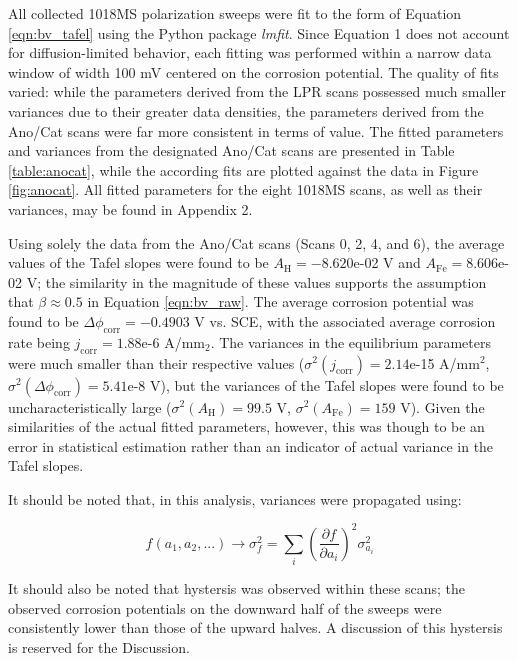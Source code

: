 All collected 1018MS polarization sweeps were fit to the form of Equation \ref{eqn:bv_tafel} using the Python package \textit{lmfit}.\cite{lmfit}  Since Equation 1 does not account for diffusion-limited behavior, each fitting was performed within a narrow data window of width 100 mV centered on the corrosion potential.  The quality of fits varied: while the parameters derived from the LPR scans possessed much smaller variances due to their greater data densities, the parameters derived from the Ano/Cat scans were far more consistent in terms of value.  The fitted parameters and variances from the designated Ano/Cat scans are presented in Table \ref{table:anocat}, while the according fits are plotted against the data in Figure \ref{fig:anocat}.  All fitted parameters for the eight 1018MS scans, as well as their variances, may be found in Appendix 2.

Using solely the data from the Ano/Cat scans (Scans 0, 2, 4, and 6), the average values of the Tafel slopes were found to be $A_{\text{H}} = -8.620$e-02 V and $A_{\text{Fe}} = 8.606$e-02 V; the similarity in the magnitude of these values supports the assumption that $\beta \approx 0.5$ in Equation \ref{eqn:bv_raw}.  The average corrosion potential was found to be $\Delta \phi_{\text{corr}} = -0.4903$ V vs. SCE, with the associated average corrosion rate being $j_{\text{corr}} = 1.88$e-6 A/mm$_2$.  The variances in the equilibrium parameters were much smaller than their respective values ($\sigma^2(j_{\text{corr}}) = 2.14$e-15 A/mm$^2$, $\sigma^2(\Delta \phi_{\text{corr}}) = 5.41$e-8 V), but the variances of the Tafel slopes were found to be uncharacteristically large ($\sigma^2(A_{\text{H}}) = 99.5$ V, $\sigma^2(A_{\text{Fe}}) = 159$ V).  Given the similarities of the actual fitted parameters, however, this was though to be an error in statistical estimation rather than an indicator of actual variance in the Tafel slopes.

It should be noted that, in this analysis, variances were propagated using:

	\begin{equation}
		f(a_1, a_2, ...) \rightarrow \sigma^2_f = \sum_i \left( \frac{\partial f}{\partial a_i} \right)^2 \sigma^2_{a_i}
		\label{eqn:se}
	\end{equation}

It should also be noted that hystersis was observed within these scans; the observed corrosion potentials on the downward half of the sweeps were consistently lower than those of the upward halves.  A discussion of this hystersis is reserved for the Discussion.

